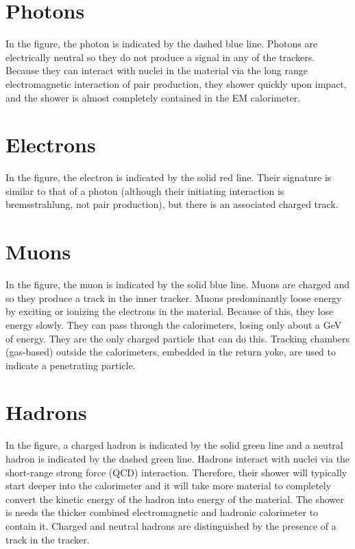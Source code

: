 \section{Photons}
In the figure, the photon is indicated by the dashed blue line.  Photons are electrically neutral so they do not produce a signal in any of the trackers.  Because they can interact with nuclei in the material via the long range electromagnetic interaction of pair production, they shower quickly upon impact, and the shower is almost completely contained in the EM calorimeter.
\section{Electrons}
In the figure, the electron is indicated by the solid red line.  Their signature is similar to that of a photon (although their initiating interaction is bremsstrahlung, not pair production), but there is an associated charged track.
\section{Muons}
In the figure, the muon is indicated by the solid blue line. Muons are charged and so they produce a track in the inner tracker. Muons predominantly loose energy by exciting or ionizing the electrons in the material.  Because of this, they lose energy slowly. They can pass through the calorimeters, losing only about a GeV of energy.  They are the only charged particle that can do this.  Tracking chambers (gas-based) outside the calorimeters, embedded in the return yoke, are used to indicate a penetrating particle.
\section{Hadrons}
In the figure, a charged hadron is indicated by the solid green line and a neutral hadron is indicated by the dashed green line. Hadrons interact with nuclei via the short-range strong force (QCD) interaction. Therefore, their shower will typically start deeper into the calorimeter and it will take more material to completely convert the kinetic energy of the hadron into energy of the material. The shower is needs the thicker combined electromagnetic and hadronic calorimeter to contain it. Charged and neutral hadrons are distinguished by the presence of a track in the tracker.
